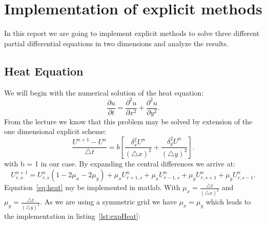 


\maketitle

\section{Implementation of explicit methods}
In this report we are going to implement explicit methods to solve three different partial differential equations in two dimensions and analyze the results.
\subsection{Heat Equation}
We will begin with the numerical solution of the heat equation:
\begin{equation}
\frac{\partial u}{\partial t} = \frac{\partial^2 u}{\partial x^2} + \frac{\partial^2 u}{\partial y^2}.
\end{equation}
From the lecture we know that this problem may be solved by extension of the one dimensional explicit scheme:
\begin{equation}
\frac{U^{n+1}-U^{n}}{\triangle t} = b [\frac{\delta_x^2 U^n}{(\triangle x)^2} + \frac{\delta_y^2 U^n}{(\triangle y)^2} ].
\end{equation}
with b = 1 in our case. By expanding the central differences we arrive at:
\begin{equation}
U_{r,x}^{n+1} = U_{r,s}^n (1 - 2\mu_x - 2\mu_y) + \mu_x U_{r+1,s}^n + \mu_x U_{r-1,s}^n + \mu_y U_{r,s+1}^n + \mu_y U_{r,s-1}^n.
\label{eq:heat}
\end{equation}
Equation~\ref{eq:heat} my be implemented in matlab. With $\mu_x = \frac{\triangle t}{(\triangle x)^2}$ and $\mu_y = \frac{\triangle t}{(\triangle y)^2}$. As we are using a symmetric grid we have $\mu_x = \mu_y$ which leads to the implementation in listing~\ref{lst:expHeat}: 


